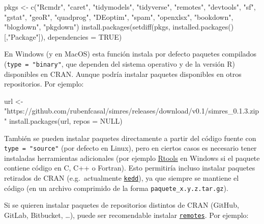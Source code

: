 \documentclass[
]{book}
\newenvironment{Shaded}{\begin{snugshade}}{\end{snugshade}}
\newcommand{\AttributeTok}[1]{\textcolor[rgb]{0.77,0.63,0.00}{#1}}
\newcommand{\ConstantTok}[1]{\textcolor[rgb]{0.00,0.00,0.00}{#1}}
\newcommand{\FunctionTok}[1]{\textcolor[rgb]{0.00,0.00,0.00}{#1}}
\newcommand{\NormalTok}[1]{#1}
\newcommand{\OtherTok}[1]{\textcolor[rgb]{0.56,0.35,0.01}{#1}}
\newcommand{\StringTok}[1]{\textcolor[rgb]{0.31,0.60,0.02}{#1}}
\theoremstyle{break}
\theoremstyle{nonumberplain}
\begin{document}
\begin{Shaded}
\begin{Highlighting}[]
\NormalTok{pkgs }\OtherTok{\textless{}{-}} \FunctionTok{c}\NormalTok{(}\StringTok{"Rcmdr"}\NormalTok{, }\StringTok{"caret"}\NormalTok{, }\StringTok{"tidymodels"}\NormalTok{, }\StringTok{"tidyverse"}\NormalTok{, }\StringTok{"remotes"}\NormalTok{, }\StringTok{"devtools"}\NormalTok{,}
          \StringTok{"sf"}\NormalTok{, }\StringTok{"gstat"}\NormalTok{, }\StringTok{"geoR"}\NormalTok{, }\StringTok{"quadprog"}\NormalTok{, }\StringTok{"DEoptim"}\NormalTok{, }\StringTok{"spam"}\NormalTok{, }\StringTok{"openxlsx"}\NormalTok{,}
            \StringTok{"bookdown"}\NormalTok{, }\StringTok{"blogdown"}\NormalTok{, }\StringTok{"pkgdown"}\NormalTok{)}
\FunctionTok{install.packages}\NormalTok{(}\FunctionTok{setdiff}\NormalTok{(pkgs, }\FunctionTok{installed.packages}\NormalTok{()[,}\StringTok{"Package"}\NormalTok{]), }\AttributeTok{dependencies =} \ConstantTok{TRUE}\NormalTok{)}
\end{Highlighting}
\end{Shaded}

En Windows (y en MacOS) esta función instala por defecto paquetes compilados (\texttt{type\ =\ "binary"}, que dependen del sistema operativo y de la versión R) disponibles en CRAN.
Aunque podría instalar paquetes disponibles en otros repositorios.
Por ejemplo:

\begin{Shaded}
\begin{Highlighting}[]
\NormalTok{url }\OtherTok{\textless{}{-}} \StringTok{"https://github.com/rubenfcasal/simres/releases/download/v0.1/simres\_0.1.3.zip"}
\FunctionTok{install.packages}\NormalTok{(url, }\AttributeTok{repos =} \ConstantTok{NULL}\NormalTok{)}
\end{Highlighting}
\end{Shaded}

También se pueden instalar paquetes directamente a partir del código fuente con \texttt{type\ =\ "source"} (por defecto en Linux), pero en ciertos casos es necesario tener instaladas herramientas adicionales (por ejemplo \href{https://cran.r-project.org/bin/windows/Rtools}{Rtools} en Windows si el paquete contiene código en C, C++ o Fortran).
Esto permitiría incluso instalar paquetes retirados de CRAN (e.g.~actualmente \href{https://CRAN.R-project.org/package=kedd}{\texttt{kedd}}), ya que siempre se mantiene el código (en un archivo comprimido de la forma \texttt{paquete\_x.y.z.tar.gz}).

Si se quieren instalar paquetes de repositorios distintos de CRAN (GitHub, GitLab, Bitbucket, \ldots), puede ser recomendable instalar \href{https://remotes.r-lib.org/}{\texttt{remotes}}.
Por ejemplo:
\end{document}
